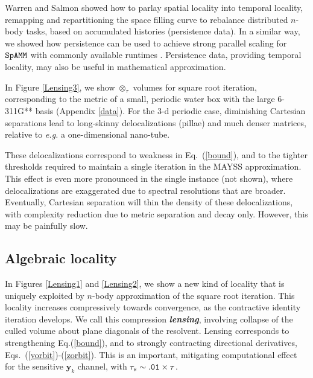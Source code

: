 \documentclass[letterpaper,twocolumn,amsmath,amsfont,amssymb,english,aps,jcp,preprintnumbers,groupaddress,nofootinbib,tightenlines,floatfix]{revtex4}
\newcommand{\mat}[1]{\boldsymbol{#1}}
\newcommand{\ot}{  {\scriptstyle \otimes}_{ \tau } }
\theoremstyle{plain}
\theoremstyle{remark}
\theoremstyle{plain}
\begin{document}
Warren and Salmon showed how to parlay spatial locality into temporal locality, 
remapping and repartitioning the space filling curve to rebalance distributed $n$-body tasks,
based on accumulated histories (persistence data).
In a similar way, we showed how persistence can be used to achieve 
strong parallel scaling for $\tt SpAMM$ with commonly available runtimes \cite{BockCK14}.  
Persistence data, providing temporal locality, may also be useful in mathematical approximation.  


In Figure \ref{Lensing3}, we show $\ot$ volumes for square root iteration, corresponding to the metric of a small, periodic water box 
with the large 6-311G** basis (Appendix \ref{data}).  
For the 3-d periodic case, diminishing Cartesian separations lead to long-skinny delocalizations (pillae)
and much denser matrices, relative to {\em e.g.} a one-dimensional nano-tube.  

These delocalizations correspond to weakness in Eq.~(\ref{bound}),  
and to the tighter thresholds required to maintain a single iteration in the MAYSS approximation.  This effect is even more pronounced in the 
single instance (not shown), where delocalizations are exaggerated due to spectral resolutions that are broader.  
Eventually, Cartesian separation will thin the density of these delocalizations,  
with complexity reduction due to metric separation and decay only.  However, this may be painfully slow.  

\subsection{Algebraic locality}

In Figures \ref{Lensing1} and \ref{Lensing2},  we show a new kind of locality that is uniquely exploited by $n$-body approximation 
of the square root iteration.  This locality increases compressively towards convergence, 
as the contractive identity iteration develops.  
We call this compression {\bf  \em lensing},  involving collapse  of the culled volume about plane diagonals of the resolvent.
Lensing corresponds to strengthening Eq.(\ref{bound}), 
and to strongly contracting directional derivatives, Eqs.~(\ref{yorbit})-(\ref{zorbit}).
This is an important, mitigating computational effect for the sensitive $\mat{y}_k$ channel, 
with $\tau_s \sim {\tt .01} \times \tau$. 
\end{document}

